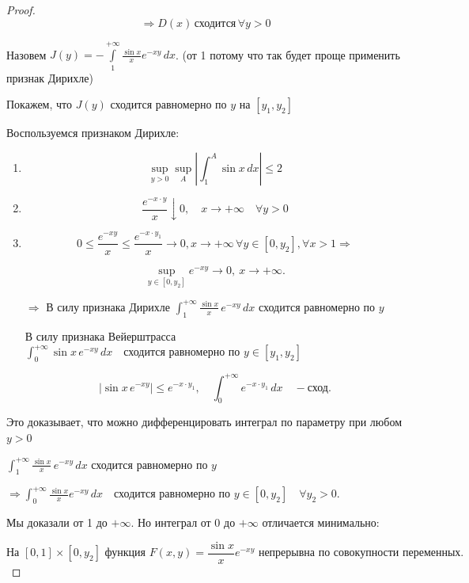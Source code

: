 \begin{proof}
\[
\Rightarrow D(x) \, \text{сходится} \, \forall y > 0
\]




Назовем $J(y) = - \int\limits_1^{+\infty} \frac{\sin x}{x}  e^{-x y} \, dx$. (от 1 потому что так будет проще применить признак Дирихле)

Покажем, что $J(y)$ сходится равномерно по $y$ на $[y_1, y_2]$


\noindent

Воспользуемся признаком Дирихле:
\begin{enumerate}


    \item 

\[
\sup_{y > 0} \sup_{A} \left| \int_{1}^{A} \sin x \, dx \right| \leq 2 
\]

    \item 
\[
\frac{e^{-x \cdot y}}{x} \downarrow 0, \quad x \to +\infty \quad \forall y > 0
\]

    \item 
\[
0 \leq \frac{e^{-x y}}{x} \leq \frac{e^{-x \cdot y_1}}{x} \rightarrow 0, x \rightarrow + \infty\, \forall y \in [0, y_2], \forall x > 1 \Rightarrow
\]


\[
\sup_{y \in [0, y_2]} e^{-x y} \to 0, \ x \to +\infty.
\]


$\Rightarrow$ В силу признака Дирихле $ \int_{1}^{+\infty} \frac{\sin x}{x} \, e^{-x y} \, dx $ сходится равномерно по $y$

В силу признака Вейерштрасса 
$
\int_{0}^{+\infty} \sin x \, e^{-x y} \, dx \quad \text{сходится равномерно по } y \in [y_1, y_2]
$

\[
|\sin x \, e^{-x y}| \leq e^{-x \cdot y_1}, \quad \int_{0}^{+\infty} e^{-x \cdot y_1} \, dx \quad - \text{сход.}
\]



\end{enumerate}


Это доказывает, что можно дифференцировать интеграл по параметру при любом $y > 0$

\setlength{\parskip}{10pt}


$\int_{1}^{+\infty} \frac{\sin x}{x} \, e^{-x y} \, dx $ сходится равномерно по $y$ 

$\Rightarrow  \int_{0}^{+\infty} \frac{\sin x}{x} e^{-x y} \, dx \quad \text{сходится равномерно по } y \in [0, y_2] \quad \forall y_2 > 0. $

\begin{note}
Мы доказали от 1 до $+\infty$. Но интеграл от 0 до $+\infty$ отличается минимально:
\end{note}
\[
\text{На } [0, 1] \times [0, y_2] \text{ функция } F(x, y) = \frac{\sin x}{x} e^{-x y} \text{ непрерывна по совокупности переменных.}
\]


\end{proof}

